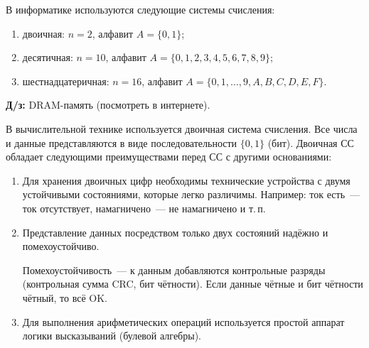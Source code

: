 \documentclass[a4paper,11pt]{article}
\begin{document}
В информатике используются следующие системы счисления:
\begin{enumerate}[label=\arabic*)]
  \item двоичная: $n = 2$, алфавит $A = \{0, 1\}$;
  \item десятичная: $n = 10$, алфавит $A = \{0, 1, 2, 3, 4, 5, 6, 7, 8, 9\}$;
  \item шестнадцатеричная: $n = 16$, алфавит $A = \{0, 1, \dots, 9, A, B, C, D, E, F\}$.
\end{enumerate}

\begin{hwbox}
\textbf{Д/з:} DRAM-память (посмотреть в интернете).
\end{hwbox}

В вычислительной технике используется двоичная система счисления. Все числа и данные
представляются в виде последовательности $\{0, 1\}$ (бит). Двоичная СС обладает следующими
преимуществами перед СС с другими основаниями:
\begin{enumerate}[label=\arabic*)]
\item Для хранения двоичных цифр необходимы технические устройства с двумя устойчивыми
      состояниями, которые легко различимы. Например: ток есть~--- ток отсутствует,
      намагничено~--- не намагничено и т.\,п.
\item Представление данных посредством только двух состояний надёжно и помехоустойчиво.

\begin{center}
\end{center}
Помехоустойчивость~--- к данным добавляются контрольные разряды (контрольная сумма CRC, бит
чётности). Если данные чётные и бит чётности чётный, то всё OK.

\item Для выполнения арифметических операций используется простой аппарат логики высказываний
      (булевой алгебры).
\end{enumerate}
\end{document}
